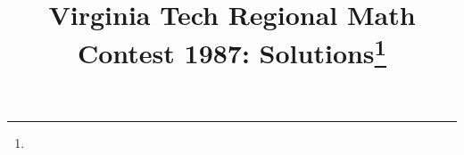 \documentclass[10pt]{article}
\begin{document}
\title{Virginia Tech Regional Math Contest 1987: Solutions\footnote{\disclaimer}}
\author{\vspace{-2ex}}
\date{\vspace{-5ex}} %
\maketitle

%

%

%

%

%

%

%

%
\end{document}
